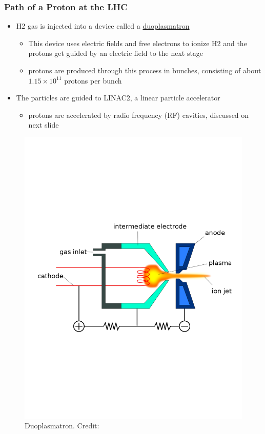 \documentclass[
	11pt, %
]{beamer}
\begin{document}
\begin{frame}
	\frametitle{Path of a Proton at the LHC}
	
\begin{itemize}
	\item H2 gas is injected into a device called a \underline{duoplasmatron}
	\begin{itemize}
		\item This device uses electric fields and free electrons to ionize H2 and the protons get guided by an 		electric field to the next stage
		\item protons are produced through this process in bunches, consisting of about $1.15 \times 				10^{11}$ protons per bunch
	\end{itemize}
	\item The particles are guided to LINAC2, a linear particle accelerator
	\begin{itemize}
		\item protons are accelerated by radio frequency (RF) cavities, discussed on next slide
	\end{itemize}
\end{itemize}

\begin{figure}[!htb]
	\vspace*{-2cm}
	\includegraphics[scale=.3]{duoplasmatron.pdf}
	\caption{Duoplasmatron. Credit: }
\end{figure}

\end{frame}
\end{document}

